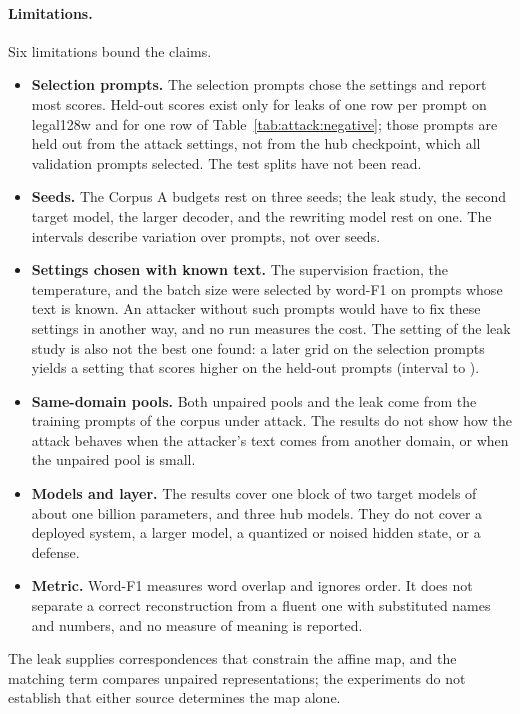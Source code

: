 \paragraph{Limitations.} Six limitations bound the claims.
\begin{itemize}
\item \textbf{Selection prompts.} The  selection prompts chose the settings and report most scores.
Held-out scores exist only for leaks of one row per prompt on legal128w and for one row of Table~\ref{tab:attack:negative}; those prompts are held out from the attack settings, not from the hub checkpoint, which all validation prompts selected.
The test splits have not been read.
\item \textbf{Seeds.} The Corpus A budgets rest on three seeds; the leak study, the second target model, the larger decoder, and the rewriting model rest on one.
The intervals describe variation over prompts, not over seeds.
\item \textbf{Settings chosen with known text.} The supervision fraction, the temperature, and the batch size were selected by word-F1 on prompts whose text is known.
An attacker without such prompts would have to fix these settings in another way, and no run measures the cost.
The setting of the leak study is also not the best one found: a later grid on the selection prompts yields a setting that scores  higher on the held-out prompts (interval  to ). %
\item \textbf{Same-domain pools.} Both unpaired pools and the leak come from the training prompts of the corpus under attack.
The results do not show how the attack behaves when the attacker's text comes from another domain, or when the unpaired pool is small.
\item \textbf{Models and layer.} The results cover one block of two target models of about one billion parameters, and three hub models.
They do not cover a deployed system, a larger model, a quantized or noised hidden state, or a defense.
\item \textbf{Metric.} Word-F1 measures word overlap and ignores order.
It does not separate a correct reconstruction from a fluent one with substituted names and numbers, and no measure of meaning is reported.
\end{itemize}

The leak supplies correspondences that constrain the affine map, and the matching term compares unpaired representations; the experiments do not establish that either source determines the map alone.
